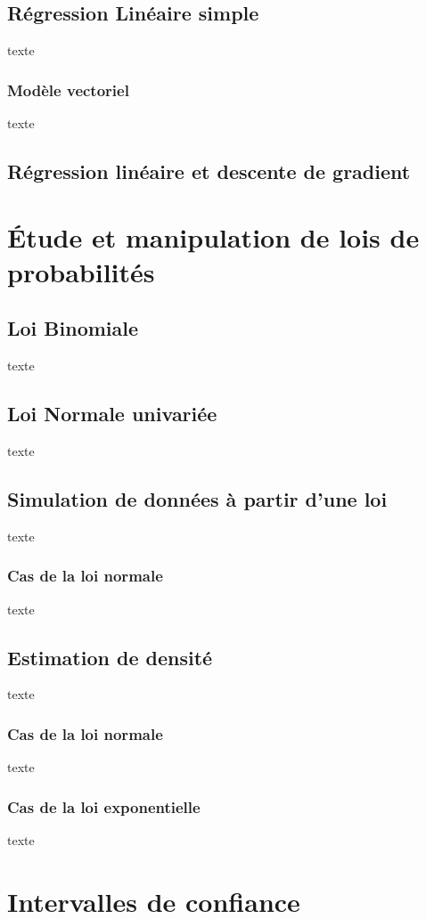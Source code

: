 \documentclass{article}      %
\begin{document}
\subsection{Régression Linéaire simple}
texte
\subsubsection{Modèle vectoriel}
texte

\subsection{Régression linéaire et descente de gradient}



\section{Étude et manipulation de lois de probabilités}
\subsection{Loi Binomiale}
texte
\subsection{Loi Normale univariée}
texte
\subsection{Simulation de données à partir d’une loi}
texte

\subsubsection{Cas de la loi normale}
texte

\subsection{Estimation de densité}
texte

\subsubsection{Cas de la loi normale}
texte
\subsubsection{Cas de la loi exponentielle}
texte


\section{Intervalles de confiance}
\end{document}

